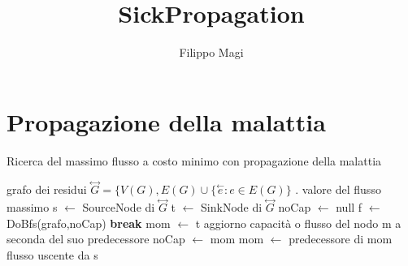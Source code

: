 \documentclass{article}
\title{SickPropagation}
\author{Filippo Magi }
\begin{document}
\maketitle

\section{Propagazione della malattia}
\begin{algorithm}
\caption{Ricerca del massimo flusso a costo minimo con propagazione della malattia}
\begin{algorithmic}
\REQUIRE grafo dei residui $\overset{\leftrightarrow}{G} = \{V(G),E(G) \cup \{ \overset{\leftarrow}{e} : e \in E(G) \}$ .
\ENSURE valore del flusso massimo
\STATE s $\leftarrow$ SourceNode di $\overset{\leftrightarrow}{G}$
\STATE t $\leftarrow$ SinkNode di $\overset{\leftrightarrow}{G}$
\STATE noCap $\leftarrow$ null
\LOOP
\STATE f $\leftarrow$ DoBfs(grafo,noCap)
\STATE \textbf{break}
\ENDIF
\STATE mom $\leftarrow$ t
\STATE aggiorno capacità o flusso del nodo m a seconda del suo predecessore
\STATE noCap $\leftarrow$ mom
\ENDIF
\STATE mom $\leftarrow$ predecessore di mom
\ENDWHILE
\ENDLOOP
\RETURN flusso uscente da s
\end{algorithmic}
\end{algorithm}
\end{document}
